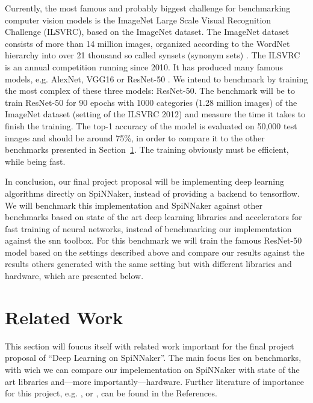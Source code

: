 \documentclass{article}
\begin{document}
Currently, the most famous and probably biggest challenge
for benchmarking computer vision models is the
ImageNet Large Scale Visual Recognition Challenge (ILSVRC),
based on the ImageNet dataset.
The ImageNet dataset consists of more than 14 million
images, organized according to the WordNet hierarchy into
over 21 thousand so called synsets (synonym sets)
\citep{imagenet, wordnet}.
The ILSVRC is an annual competition running since 2010.
It has produced many famous models, e.g. AlexNet, VGG16 or
ResNet-50 \citep{alexnet, simonyan_et_al_2014,
  he_et_al_2015}.
We intend to benchmark by training the most complex of
these three models: ResNet-50.
The benchmark will be to train ResNet-50 for 90 epochs with
1000 categories (1.28 million images) of the ImageNet
dataset (setting of the ILSVRC 2012) and measure the time
it takes to finish the training.
The top-1 accuracy of the model is evaluated on 50,000 test
images and should be around 75\%, in order to compare it to
the other benchmarks presented in
Section~\ref{sec:related_work}.
The training obviously must be efficient, while being fast.

In conclusion, our final project proposal will be
implementing deep learning algorithms directly on
SpiNNaker, instead of providing a backend to tensorflow.
We will benchmark this implementation and SpiNNaker against
other benchmarks based on state of the art deep learning
libraries and accelerators for fast training of neural
networks, instead of benchmarking our implementation
against the snn toolbox.
For this benchmark we will train the famous ResNet-50 model
based on the settings described above and compare our
results against the results others generated with the same
setting but with different libraries and hardware, which
are presented below.


\section{Related Work} %
\label{sec:related_work}

This section will foucus itself with related work important
for the final project proposal of ``Deep Learning on
SpiNNaker''.
The main focus lies on benchmarks, with wich we can compare
our impelementation on SpiNNaker with state of the art
libraries and---more importantly---hardware.
Further literature of importance for this project, e.g.
\citet{he_et_al_2015}, \citet{goodfellow2016} or
\citet{imagenet}, can be found in the References.
\end{document}
